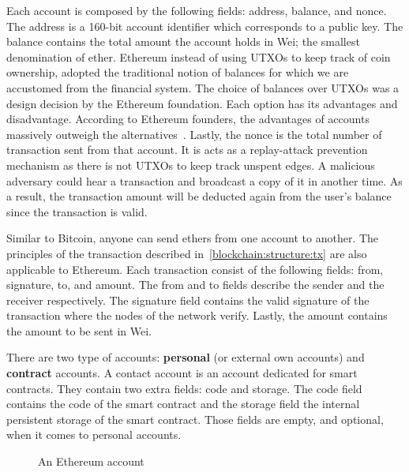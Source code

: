 Each account is composed by the following fields: address, balance, and nonce. The address is a 160-bit account identifier which corresponds to a public key. The balance contains the total amount the account holds in Wei; the smallest denomination of ether. Ethereum instead of using UTXOs to keep track of coin ownership, adopted the traditional notion of balances for which we are accustomed from the financial system. The choice of balances over UTXOs was a design decision by the Ethereum foundation. Each option has its advantages and disadvantage. According to Ethereum founders, the advantages of accounts massively outweigh the alternatives~\cite{eth_design}. Lastly, the nonce is the total number of transaction sent from that account. It is acts as a replay-attack prevention mechanism as there is not UTXOs to keep track unspent edges. A malicious adversary could hear a transaction and broadcast a copy of it in another time. As a result, the transaction amount will be deducted again from the user's balance since the transaction is valid.

Similar to Bitcoin, anyone can send ethers from one account to another. The principles of the transaction described in~\ref{blockchain:structure:tx} are also applicable to Ethereum. Each transaction consist of the following fields: from, signature, to, and amount. The from and to fields describe the sender and the receiver respectively. The signature field contains the valid signature of the transaction where the nodes of the network verify. Lastly, the amount contains the amount to be sent in Wei.

There are two type of accounts: \textbf{personal} (or external own accounts) and \textbf{contract} accounts. A contact account is an account dedicated for smart contracts. They contain two extra fields: code and storage. The code field contains the code of the smart contract and the storage field the internal persistent storage of the smart contract. Those fields are empty, and optional, when it comes to personal accounts.

\begin{figure}[!ht]
  \centering
  \caption{An Ethereum account}
  \label{fig:eth_account}
\end{figure}

